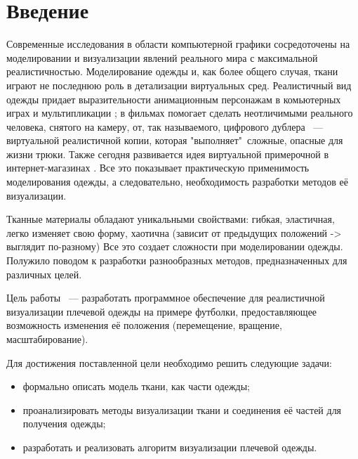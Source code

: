 \chapter*{Введение}

Современные исследования в области компьютерной графики сосредоточены на
моделировании и визуализации явлений реального мира с максимальной
реалистичностью. Моделирование одежды и, как более общего случая, ткани играют
не последнюю роль в детализации виртуальных сред.\cite{Simnett2012RealtimeSA}
Реалистичный вид одежды придает выразительности анимационным персонажам в
комьютерных играх и мультипликации \cite{Zurdo2013AnimatingWB}; в фильмах
помогает сделать неотличимыми реального человека, снятого на камеру, от, так
называемого, цифрового дублера ~--- виртуальной реалистичной копии, которая
"выполняет"\ сложные,  опасные для жизни трюки. \cite{Stuyck2018ClothSF} Также
сегодня развивается идея виртуальной примерочной в интернет-магазинах
\cite{Keckeisen2005PhysicalCS}. Все это показывает практическую применимость
моделирования одежды, а следовательно, необходимость разработки методов её
визуализации.

Тканные материалы обладают уникальными свойствами: гибкая, эластичная, легко
изменяет свою форму, хаотична (зависит от предыдущих положений -> выглядит
по-разному) Все это создает сложности при моделировании одежды. Полужило
поводом к разработки разнообразных методов, предназначенных для различных
целей.

Цель работы ~--- разработать программное обеспечение для реалистичной
визуализации плечевой одежды на примере футболки, предоставляющее возможность
изменения её положения (перемещение, вращение, масштабирование).

Для достижения поставленной цели необходимо решить следующие задачи:
\begin{itemize}[left=\parindent] \item  формально описать модель ткани, как
            части одежды; \item  проанализировать методы визуализации ткани и
            соединения её частей для получения одежды; \item  разработать и
                реализовать алгоритм визуализации плечевой одежды.
\end{itemize}

% 
% 
